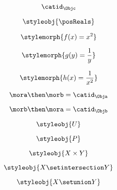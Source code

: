 {\begin{forslides}
        \begin{equation}
            \label{eq:26}
            \catid_{\Objc}
        \end{equation}

        \begin{equation}
            \label{eq:27}
            \styleobj{\posReals}
        \end{equation}

        \begin{equation}
            \label{eq:28}
            \stylemorph{f(x) = x^2}
        \end{equation}

        \begin{equation}
            \label{eq:29}
            \stylemorph{g(y) = \frac{1}{y}}
        \end{equation}

        \begin{equation}
            \label{eq:30}
            \stylemorph{h(x) = \frac{1}{x^2}}
        \end{equation}

        \begin{equation}
            \label{eq:31}
            \mora \then \morb = \catid_\Obja
        \end{equation}

        \begin{equation}
            \label{eq:32}
            \morb \then \mora = \catid_\Objb
        \end{equation}

        \begin{equation}
            \label{eq:33}
            \styleobj{U}
        \end{equation}

        \begin{equation}
            \label{eq:34}
            \styleobj{P}
        \end{equation}

        \begin{equation}
            \label{eq:35}
            \styleobj{X \times Y}
        \end{equation}

        \begin{equation}
            \label{eq:36}
            \styleobj{X \setintersection Y}
        \end{equation}

        \begin{equation}
            \label{eq:37}
            \styleobj{X \setunion Y}
        \end{equation}


\end{forslides}}
